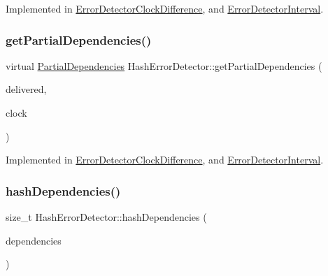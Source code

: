 Implemented in \hyperlink{classErrorDetectorClockDifference_a15406c8d7652f3b9358b1958d3723933}{Error\+Detector\+Clock\+Difference}, and \hyperlink{classErrorDetectorInterval_a6cb5dc28ef7349060d15727e92a6780a}{Error\+Detector\+Interval}.

\mbox{\label{classHashErrorDetector_a5b9f7e8a6f63b1582e912102021c2d8d}} 
\subsubsection{\texorpdfstring{get\+Partial\+Dependencies()}{getPartialDependencies()}}
{\footnotesize\ttfamily virtual \hyperlink{classPartialDependencies}{Partial\+Dependencies} Hash\+Error\+Detector\+::get\+Partial\+Dependencies (\begin{DoxyParamCaption}\item[{const vector$<$ \hyperlink{structures_8h_a7e7bdc1d2fff8a9436f2f352b2711ed6}{message\+Info} $>$ \&}]{delivered,  }\item[{const \hyperlink{classProbabilisticClock}{Probabilistic\+Clock} \&}]{clock }\end{DoxyParamCaption})\hspace{0.3cm}{\ttfamily [pure virtual]}}



Implemented in \hyperlink{classErrorDetectorClockDifference_a26f4c2905859947201d0a18146f2e961}{Error\+Detector\+Clock\+Difference}, and \hyperlink{classErrorDetectorInterval_a9494a918f551eb1efcab39ffd68316d6}{Error\+Detector\+Interval}.

\mbox{\label{classHashErrorDetector_a37d0ee7d8a01b530a03262e4483c53d9}} 
\subsubsection{\texorpdfstring{hash\+Dependencies()}{hashDependencies()}}
{\footnotesize\ttfamily size\+\_\+t Hash\+Error\+Detector\+::hash\+Dependencies (\begin{DoxyParamCaption}\item[{const vector$<$ unsigned int $>$ \&}]{dependencies }\end{DoxyParamCaption})}

